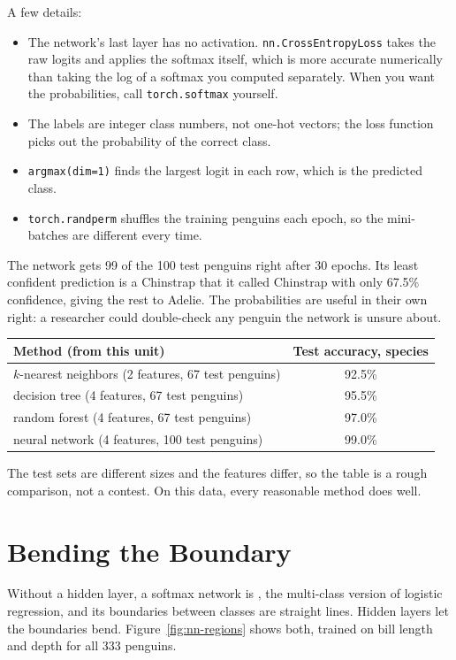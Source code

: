 A few details:
\begin{itemize}
\item The network's last layer has no activation. \verb|nn.CrossEntropyLoss| takes the raw logits and applies the
softmax itself, which is more accurate numerically than taking the log of a softmax you computed separately. When
you want the probabilities, call \verb|torch.softmax| yourself.
\item The labels are integer class numbers, not one-hot vectors; the loss function picks out the probability of the
correct class.
\item \verb|argmax(dim=1)| finds the largest logit in each row, which is the predicted class.
\item \verb|torch.randperm| shuffles the training penguins each epoch, so the mini-batches are different every time.
\end{itemize}

The network gets 99 of the 100 test penguins right after 30 epochs. Its least confident prediction is a Chinstrap
that it called Chinstrap with only 67.5\% confidence, giving the rest to Adelie. The probabilities are useful in
their own right: a researcher could double-check any penguin the network is unsure about.

\begin{center}
\begin{tabular}{l c}
\textbf{Method (from this unit)} & \textbf{Test accuracy, species} \\
\hline
$k$-nearest neighbors (2 features, 67 test penguins) & 92.5\% \\
decision tree (4 features, 67 test penguins) & 95.5\% \\
random forest (4 features, 67 test penguins) & 97.0\% \\
neural network (4 features, 100 test penguins) & 99.0\% \\
\end{tabular}
\end{center}

The test sets are different sizes and the features differ, so the table is a rough comparison, not a contest. On
this data, every reasonable method does well.

\section{Bending the Boundary}
Without a hidden layer, a softmax network is , the multi-class
version of logistic regression, and its boundaries between classes are straight lines. Hidden layers let the
boundaries bend. Figure~\ref{fig:nn-regions} shows both, trained on bill length and depth for all 333 penguins.

